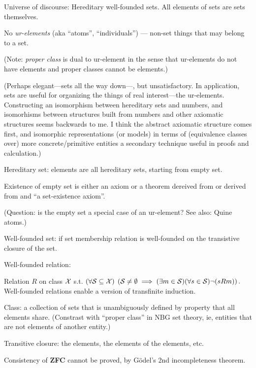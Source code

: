 Universe of discourse: 
Hereditary well-founded sets.
All elements of sets are sets themselves.

No \textsl{ur-elements}\cite{wiki:Urelement} 
(aka ``atoms'', ``individuals'') ---
non-set things that may belong to a set.

(Note: \textsl{proper class} is dual to ur-element in the sense that
ur-elements do not have elements and proper classes cannot be 
elements.)

(Perhaps elegant---sets all the way down---, but unsatisfactory. 
In application, sets are useful for organizing the things
of real interest---the ur-elements.
Constructing an isomorphism between hereditary sets
and numbers, and isomorhisms between structures built
from numbers and other axiomatic structures seems
backwards to me.
I think the abstract axiomatic structure comes first, 
and isomorphic representations (or models) in terms of 
(equivalence classes over) more concrete/primitive
entities a secondary technique useful in proofs and calculation.)

Hereditary set: elements are all hereditary sets, 
starting from empty set\cite{wiki:Hereditary-set}.

Existence of empty set is either an 
axiom\cite{wiki:Axiom_of_empty_set}
or a theorem dereived from 
or derived from 
and ``a set-existence axiom''.

(Question: is the empty set a special case of an ur-element?
See also: Quine atoms\cite{wiki:Urelement}.)

Well-founded set: if set membership relation
is well-founded on the transistive closure of the set.

Well-founded relation\cite{wiki:Well-founded-relation}: 
 
Relation $R$ on class $\mathcal{X}$ s.t. 
$(\forall \mathcal{S} \subseteq \mathcal{X})
\; \left(\mathcal{S} \neq \emptyset \implies 
(\exists m \in \mathcal{S})(\forall s\in \mathcal{S})\lnot (sRm)\right).$
Well-founded relations enable a version of transfinite induction.

Class\cite{wiki:Class_set_theory}:
a collection of sets that is unambiguously defined
by property that all elements share. 
(Constrast with ``proper class'' 
in NBG set theory\cite{wiki:NBG-set-theory},
ie, entities that are not elements of another entity.)

Transitive closure: the elements, the elements of the elements,
etc.

Consistency of \textbf{ZFC} cannot be proved, 
by G\"{o}del's 2nd incompleteness theorem.

